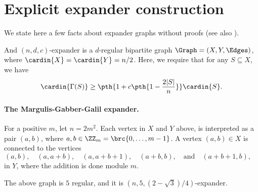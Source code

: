 
\makeatletter
{}
\makeatother
\ifx\bookMode\undefined%
\fi





\ChapterPrefix{}
\ChapterGen{}


\providecommand{\altK}{\nu}


\section{Explicit expander construction}

We state here a few facts about expander graphs without proofs (see
also ).


\begin{defn}
    And $(n,d,c)$-expander is a $d$-regular bipartite graph
    $\Graph=(X,Y,\Edges)$, where $\cardin{X} = \cardin{Y}=n/2$. Here,
    we require that for any $S \subseteq X$, we have
    \begin{equation*}
        \cardin{\Gamma(S)}\geq \pth{ 1 + c \pth{1- \frac{2|S|}{n}}} \cardin{S}.
    \end{equation*}
\end{defn}

\paragraph*{The Margulis-Gabber-Galil expander.}
For a positive $m$, let $n=2m^2$. Each vertex in $X$ and $Y$ above, is
interpreted as a pair $(a,b)$, where
$a, b \in \ZZ_m = \brc{0,\ldots, m-1}$. A vertex $(a,b) \in X$ is
connected to the vertices
\begin{equation*}
    (a,b), \quad%
    (a,a+b), \quad%
    (a,a+b+1), \quad%
    (a+b,b), \quad \text{and} \quad%
    (a+b+1,b), \quad%
\end{equation*}
in $Y$, where the addition is done module $m$. %

\begin{theorem}
    The above graph is $5$ regular, and it is
    $(n,5,(2-\sqrt{3})/4)$-expander.
\end{theorem}

